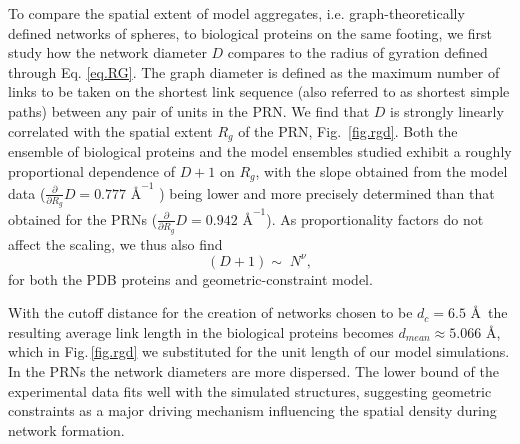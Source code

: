 \documentclass[9pt]{elife}
\begin{document}
To compare the spatial extent of model aggregates, i.e. graph-theoretically defined networks of spheres, to biological proteins on the same footing, we first study how the network diameter $D$ compares to the radius of gyration defined through Eq. \eqref{eq.RG}. The graph diameter is defined as the maximum number of links to be taken on the shortest link sequence (also referred to as shortest simple paths) between any pair of units in the PRN.
We find that $D$ is strongly linearly correlated with the spatial extent $R_g$ of the PRN, Fig.~\ref{fig.rgd}. Both the ensemble of biological proteins and the model ensembles studied exhibit a roughly proportional dependence of $D+1$ on $R_g$, with the slope obtained from the model data ($\tfrac{\partial}{\partial R_g}D = 0.777 \textrm{ \AA}^{-1}$ ) being lower and more precisely determined than that obtained for the PRNs ($\tfrac{\partial}{\partial R_g}D = 0.942 \textrm{ \AA}^{-1}$). As proportionality factors do not affect the scaling, we thus also find
\begin{equation}
 (D+1) \sim\; N^{\nu},
 \label{eq.scaling}
\end{equation}
for both the PDB proteins and geometric-constraint model.

With the cutoff distance for the creation of networks chosen to be $d_c=6.5$ \AA\, the resulting average link length in the biological proteins becomes $d_{mean}\approx5.066$ \AA, which in Fig.\,\ref{fig.rgd} we substituted for the unit length of our model simulations. In the PRNs the network diameters are more dispersed. The lower bound of the experimental data fits well with the simulated structures, suggesting geometric constraints as a major driving mechanism influencing the spatial density during network formation.
\end{document}
